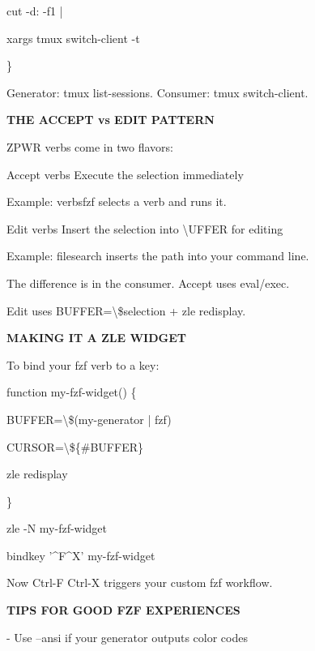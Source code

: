 \documentclass[11pt,a4paper,twoside]{book}
\begin{document}
cut -d: -f1 |

\begin{codebox}
xargs tmux switch-client -t\\
\end{codebox}

\}

Generator: tmux list-sessions. Consumer: tmux switch-client.


\vspace{12pt}
{\bfseries\color{neonyellow} THE ACCEPT vs EDIT PATTERN}\vspace{4pt}

ZPWR verbs come in two flavors:

Accept verbs  Execute the selection immediately

Example: verbsfzf selects a verb and runs it.

Edit verbs    Insert the selection into \textbackslash{}UFFER for editing

Example: filesearch inserts the path into your command line.

The difference is in the consumer. Accept uses eval/exec.

Edit uses BUFFER=\textbackslash{}\$selection + zle redisplay.


\vspace{12pt}
{\bfseries\color{neonyellow} MAKING IT A ZLE WIDGET}\vspace{4pt}

To bind your fzf verb to a key:

function my-fzf-widget() \{

BUFFER=\textbackslash{}\$(my-generator | fzf)

CURSOR=\textbackslash{}\$\{\#BUFFER\}

zle redisplay

\}

zle -N my-fzf-widget

\begin{codebox}
bindkey '\textasciicircum{}F\textasciicircum{}X' my-fzf-widget\\
\end{codebox}

Now Ctrl-F Ctrl-X triggers your custom fzf workflow.


\vspace{12pt}
{\bfseries\color{neonyellow} TIPS FOR GOOD FZF EXPERIENCES}\vspace{4pt}

- Use --ansi if your generator outputs color codes
\end{document}
